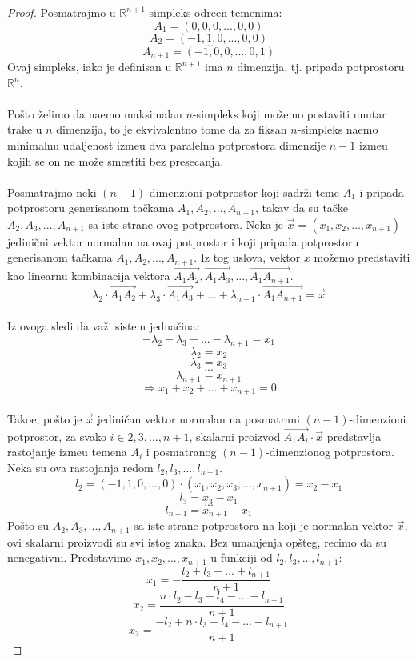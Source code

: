 \documentclass[11pt]{article}
\renewcommand{\vv}{\overrightarrow}
\begin{document}
\begin{proof}
Posmatrajmo u $\mathbb{R}^{n+1}$ simpleks odre\dj en temenima:
$$A_1=(0, 0, 0, ..., 0, 0)$$
$$A_2=(-1, 1, 0, ..., 0, 0)$$
$$...$$
$$A_{n+1}=(-1,0,0,..., 0, 1)$$
Ovaj simpleks, iako je definisan u $\mathbb{R}^{n+1}$ ima $n$ dimenzija, tj. pripada potprostoru $\mathbb{R}^n$. 
 \\
\\
\indent Po\v sto \v zelimo da na\dj emo maksimalan $n$-simpleks koji mo\v zemo postaviti unutar trake u $n$ dimenzija, to je ekvivalentno tome da za fiksan $n$-simpleks na\dj emo minimalnu udaljenost izme\dj u dva paralelna potprostora dimenzije $n-1$ izme\dj u kojih se on ne mo\v ze smestiti bez presecanja.
\\
\\
\indent Posmatrajmo neki $(n-1)$-dimenzioni potprostor koji sadr\v zi teme $A_1$ i pripada potprostoru generisanom ta\v ckama $A_1, A_2,..., A_{n+1}$, takav da su ta\v cke $A_2, A_3,..., A_{n+1}$ sa iste strane ovog potprostora. Neka je $\vv{x}=(x_1, x_2,..., x_{n+1})$ jedini\v cni vektor normalan na ovaj potprostor i koji pripada potprostoru generisanom ta\v ckama $A_1, A_2,..., A_{n+1}$. Iz tog uslova, vektor $x$ mo\v zemo predstaviti kao linearnu kombinacija vektora $\vv{A_1A_2}, \vv{A_1A_3},...,\vv{A_1 A_{n+1}}$.
\\
$$\lambda_2 \cdot \vv{A_1A_2}+\lambda_3 \cdot \vv{A_1A_3}+...+\lambda_{n+1}\cdot \vv{A_1A_{n+1}}=\vv{x}$$
\\
Iz ovoga sledi da va\v zi sistem jedna\v cina:
$$ -\lambda_2-\lambda_3-...-\lambda_{n+1}=x_1$$
$$\lambda_2=x_2$$
$$\lambda_3=x_3$$
$$...$$
$$\lambda_{n+1}=x_{n+1}$$
$$\Rightarrow x_1+x_2+...+x_{n+1}=0 $$
\\
Tako\dj e, po\v sto je $\vv{x}$ jedini\v can vektor normalan na posmatrani $(n-1)$-dimenzioni potprostor, za svako $i\in {2, 3,..., n+1}$, skalarni proizvod $\vv{A_1A_i}\cdot \vv{x}$ predstavlja rastojanje izme\dj u temena $A_i$ i posmatranog $(n-1)$-dimenzionog potprostora. Neka su ova rastojanja redom $l_2, l_3,..., l_{n+1}$.
$$l_2=(-1, 1, 0,..., 0)\cdot (x_1, x_2, x_3,..., x_{n+1})=x_2-x_1$$
$$l_3=x_3-x_1$$
$$...$$
$$l_{n+1}=x_{n+1}-x_1$$
Po\v sto su $A_2, A_3,..., A_{n+1}$ sa iste strane potprostora na koji je normalan vektor $\vv{x}$, ovi skalarni proizvodi su svi istog znaka. Bez umanjenja op\v steg, recimo da su nenegativni.
Predstavimo $x_1, x_2,..., x_{n+1}$ u funkciji od $l_2, l_3,..., l_{n+1}$:
$$x_1=-\frac{l_2+l_3+...+l_{n+1}}{n+1}$$
$$x_2=\frac{n\cdot l_2-l_3-l_4-...-l_{n+1}}{n+1}$$
$$x_3=\frac{-l_2+n\cdot l_3-l_4-...-l_{n+1}}{n+1}$$

\end{proof}
\end{document}
